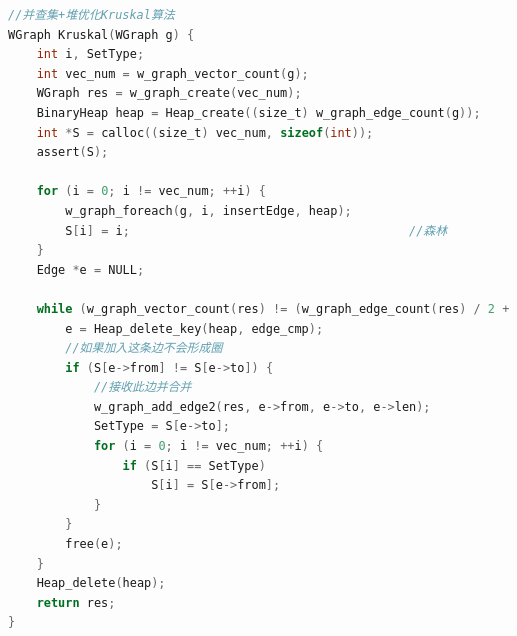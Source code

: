 \documentclass[a4paper,10pt]{ctexart}
\begin{document}
\begin{lstlisting}[language={C}]
//并查集+堆优化Kruskal算法
WGraph Kruskal(WGraph g) {
    int i, SetType;
    int vec_num = w_graph_vector_count(g);
    WGraph res = w_graph_create(vec_num);
    BinaryHeap heap = Heap_create((size_t) w_graph_edge_count(g));
    int *S = calloc((size_t) vec_num, sizeof(int));
    assert(S);

    for (i = 0; i != vec_num; ++i) {
        w_graph_foreach(g, i, insertEdge, heap);
        S[i] = i;                                       //森林
    }
    Edge *e = NULL;

    while (w_graph_vector_count(res) != (w_graph_edge_count(res) / 2 + 1)) {
        e = Heap_delete_key(heap, edge_cmp);
        //如果加入这条边不会形成圈
        if (S[e->from] != S[e->to]) {
            //接收此边并合并
            w_graph_add_edge2(res, e->from, e->to, e->len);
            SetType = S[e->to];
            for (i = 0; i != vec_num; ++i) {
                if (S[i] == SetType)
                    S[i] = S[e->from];
            }
        }
        free(e);
    }
    Heap_delete(heap);
    return res;
}

\end{lstlisting}
\end{document}
